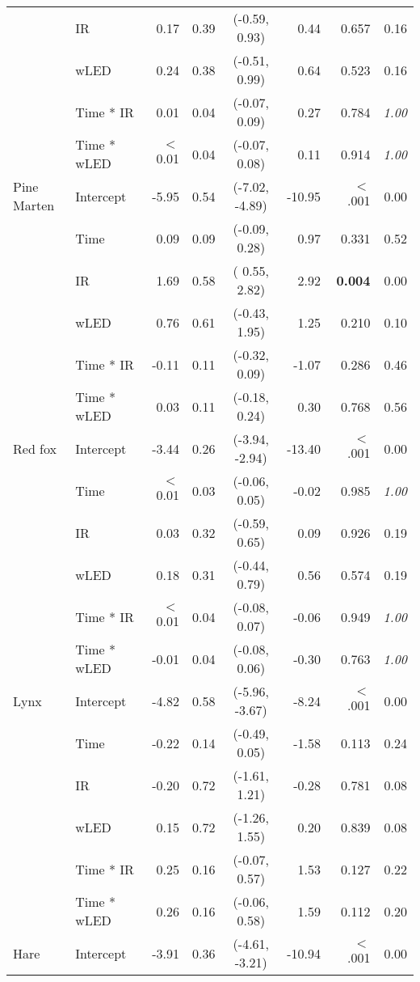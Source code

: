 \begin{tabular}[c]{llrlcrrr}
& IR & 0.17 & 0.39 & (-0.59,  0.93) & 0.44 & 0.657  & 0.16 \\ 
& wLED & 0.24 & 0.38 & (-0.51,  0.99) & 0.64 & 0.523  & 0.16 \\ 
& Time * IR & 0.01 & 0.04 & (-0.07,  0.09) & 0.27 & 0.784  & \textit{1.00} \\ 
& Time * wLED & $<$ 0.01 & 0.04 & (-0.07,  0.08) & 0.11 & 0.914  & \textit{1.00} \\ 
\midrule
Pine Marten & Intercept & -5.95 & 0.54 & (-7.02, -4.89) & -10.95 & $<$ .001 & 0.00 \\ 
& Time & 0.09 & 0.09 & (-0.09,  0.28) & 0.97 & 0.331  & 0.52 \\ 
& IR & 1.69 & 0.58 & ( 0.55,  2.82) & 2.92 & \textbf{0.004}  & 0.00 \\ 
& wLED & 0.76 & 0.61 & (-0.43,  1.95) & 1.25 & 0.210  & 0.10 \\ 
& Time * IR & -0.11 & 0.11 & (-0.32,  0.09) & -1.07 & 0.286  & 0.46 \\ 
& Time * wLED & 0.03 & 0.11 & (-0.18,  0.24) & 0.30 & 0.768  & 0.56 \\ 
\midrule
Red fox & Intercept & -3.44 & 0.26 & (-3.94, -2.94) & -13.40 & $<$ .001 & 0.00 \\ 
& Time & $<$ 0.01 & 0.03 & (-0.06,  0.05) & -0.02 & 0.985  & \textit{1.00} \\ 
& IR & 0.03 & 0.32 & (-0.59,  0.65) & 0.09 & 0.926  & 0.19 \\ 
& wLED & 0.18 & 0.31 & (-0.44,  0.79) & 0.56 & 0.574  & 0.19 \\ 
& Time * IR & $<$ 0.01 & 0.04 & (-0.08,  0.07) & -0.06 & 0.949  & \textit{1.00} \\ 
& Time * wLED & -0.01 & 0.04 & (-0.08,  0.06) & -0.30 & 0.763  & \textit{1.00} \\ 
\midrule
Lynx & Intercept & -4.82 & 0.58 & (-5.96, -3.67) & -8.24 & $<$ .001 & 0.00 \\ 
& Time & -0.22 & 0.14 & (-0.49,  0.05) & -1.58 & 0.113  & 0.24 \\ 
& IR & -0.20 & 0.72 & (-1.61,  1.21) & -0.28 & 0.781  & 0.08 \\ 
& wLED & 0.15 & 0.72 & (-1.26,  1.55) & 0.20 & 0.839  & 0.08 \\ 
& Time * IR & 0.25 & 0.16 & (-0.07,  0.57) & 1.53 & 0.127  & 0.22 \\ 
& Time * wLED & 0.26 & 0.16 & (-0.06,  0.58) & 1.59 & 0.112  & 0.20 \\ 
\midrule
Hare & Intercept & -3.91 & 0.36 & (-4.61, -3.21) & -10.94 & $<$ .001 & 0.00 \\ 

\end{tabular}
